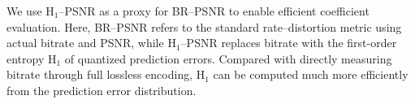 



We use H$_1$–PSNR as a proxy for BR–PSNR to enable efficient coefficient evaluation. Here, BR–PSNR refers to the standard rate–distortion metric using actual bitrate and PSNR, while H$_1$–PSNR replaces bitrate with the first-order entropy H$_1$ of quantized prediction errors. Compared with directly measuring bitrate through full lossless encoding, H$_1$ can be computed much more efficiently from the prediction error distribution.

